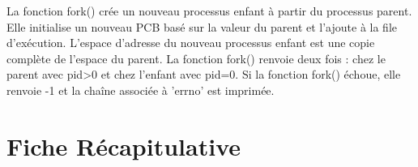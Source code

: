 \documentclass[12pt]{report}
\begin{document}
\begin{tcolorbox}[
  colback=yellow!10,
  colframe=yellow,
  title={\fontfamily{lmr}\selectfont \faBookmark À retenir},
  fonttitle=\bfseries,
  fontupper=\fontfamily{lmr}\selectfont,
  boxrule=1pt,
  sharp corners,
  
]
La fonction fork() crée un nouveau processus enfant à partir du processus parent. Elle initialise un nouveau PCB basé sur la valeur du parent et l'ajoute à la file d'exécution. L'espace d'adresse du nouveau processus enfant est une copie complète de l'espace du parent. La fonction fork() renvoie deux fois : chez le parent avec pid>0 et chez l'enfant avec pid=0. Si la fonction fork() échoue, elle renvoie -1 et la chaîne associée à 'errno' est imprimée.
\end{tcolorbox}


\section*{Fiche Récapitulative}
\end{document}
